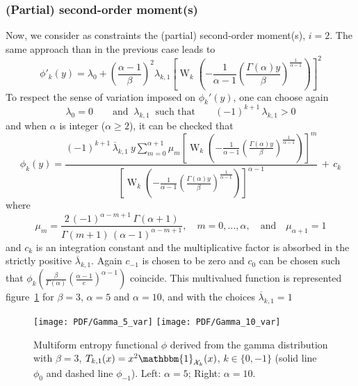 \documentclass[english]{elsarticle}
\theoremstyle{definition}
\theoremstyle{plain}
\theoremstyle{plain}
\def\X{\mathcal{X}}
\def\un{\mathbbm{1}}
\def\W{\operatorname{W}}
\begin{document}





\subsubsection{(Partial) second-order moment(s)}

Now, we consider as constraints the (partial) second-order moment(s),
$i=2$. The same approach than in the previous case leads to 
\[
\phi'_{k}(y)=\lambda_{0}+\left(\frac{\alpha-1}{\beta}\right)^{2}\lambda_{k,1}\left[\W_{k}\left(-\frac{1}{\alpha-1}\left(\frac{\Gamma(\alpha)y}{\beta}\right)^{\frac{1}{\alpha-1}}\right)\right]^{2}
\]
To respect the sense of variation imposed on $\phi_{k}'(y)$, one
can choose again 
\[
\lambda_{0}=0\qquad\mbox{and }\:\lambda_{k,1}\:\mbox{ such that}\qquad(-1)^{k+1}\,\lambda_{k,1}>0
\]
and when $\alpha$ is integer ($\alpha\ge2$), it can be checked that
\[
\phi_{k}(y)=\frac{{\displaystyle (-1)^{k+1}\,\overline{\lambda}_{k,1}\: y\sum_{m=0}^{\alpha+1}\mu_{m}\left[\W_{k}\left(-\frac{1}{\alpha-1}\left(\frac{\Gamma(\alpha)y}{\beta}\right)^{\frac{1}{\alpha-1}}\right)\right]^{m}}}{\left[\W_{k}\left(-\frac{1}{\alpha-1}\left(\frac{\Gamma(\alpha)y}{\beta}\right)^{\frac{1}{\alpha-1}}\right)\right]^{\alpha-1}}\,+\, c_{k}
\]
where 
\[
\mu_{m}=\frac{2\,(-1)^{\alpha-m+1}\,\Gamma(\alpha+1)}{\Gamma(m+1)\,(\alpha-1)^{\alpha-m+1}},\quad m=0,\ldots,\alpha,\quad\mbox{and}\quad\mu_{\alpha+1}=1
\]
and $c_{k}$ is an integration constant and the multiplicative factor
is absorbed in the strictly positive $\overline{\lambda}_{k,1}$.
Again $c_{-1}$ is chosen to be zero and $c_{0}$ can be chosen such
that $\phi_{k}\left(\frac{\beta}{\Gamma(\alpha)}\left(\frac{\alpha-1}{e}\right)^{\alpha-1}\right)$
coincide. This multivalued function is represented figure~\ref{fig:Entropy-gamma-var}
for $\beta=3$, $\alpha=5$ and $\alpha=10$, and with the choices
$\overline{\lambda}_{k,1}=1$ %
\begin{figure}[htbp]
\centerline{ \texttt{[image: PDF/Gamma\_5\_var]} \hspace{2mm}
\texttt{[image: PDF/Gamma\_10\_var]}} \caption{Multiform entropy functional $\phi$ derived from the gamma distribution
with $\beta=3$, $T_{k,1}(x)=x^{2}\un_{\X_{k}}(x)$, $k\in\{0,-1\}$
(solid line $\phi_{0}$ and dashed line $\phi_{-1}$). Left: $\alpha=5$;
Right: $\alpha=10$.}


\label{fig:Entropy-gamma-var} 
\end{figure}
\end{document}
